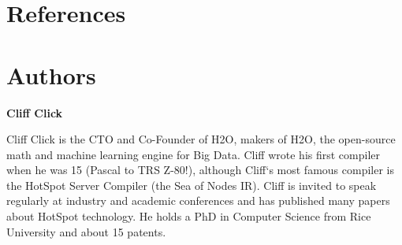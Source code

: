 \newpage
\section{References}



















\newpage

\section{Authors}

\textbf{Cliff Click}

Cliff Click is the CTO and Co-Founder of H2O, makers of H2O, the open-source math and machine learning engine for Big Data. Cliff wrote his first compiler when he was 15 (Pascal to TRS Z-80!), although Cliff`s most famous compiler is the HotSpot Server Compiler (the Sea of Nodes IR). Cliff is invited to speak regularly at industry and academic conferences and has published many papers about HotSpot technology. He holds a PhD in Computer Science from Rice University and about 15 patents.

